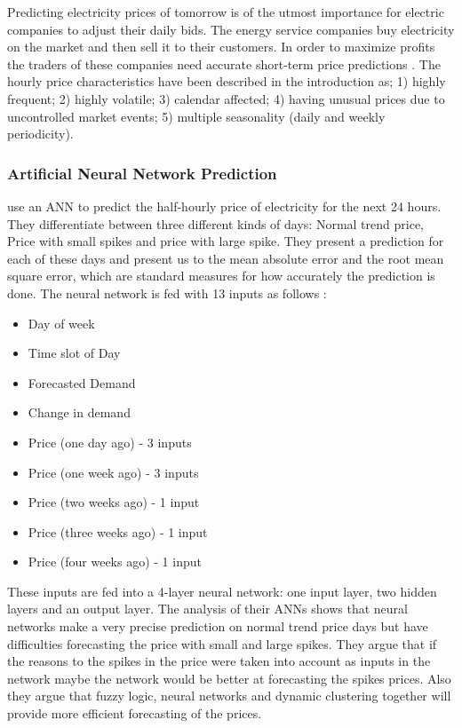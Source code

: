 Predicting electricity prices of tomorrow is of the utmost importance for electric companies to adjust their daily bids. The energy service companies buy electricity on the market and then sell it to their customers. In order to maximize profits the traders of these companies need accurate short-term price predictions \cite{EnergyPriceForecasting}. The hourly price characteristics have been described in the introduction as; 1) highly frequent; 2) highly volatile; 3) calendar affected; 4) having unusual prices due to uncontrolled market events; 5) multiple seasonality (daily and weekly periodicity).

\subsubsection{Artificial Neural Network Prediction}\label{sec:scatterPaper}
\cite{singhal2011electricity} use an ANN to predict the half-hourly price of electricity for the next 24 hours. They differentiate between three different kinds of days: Normal trend price, Price with small spikes and price with large spike. They present a prediction for each of these days and present us to the mean absolute error and the root mean square error, which are standard measures for how accurately the prediction is done. The neural network is fed with 13 inputs as follows \cite{singhal2011electricity}:
\begin{itemize}[noitemsep,topsep=3pt,parsep=2pt,partopsep=3pt]
\item Day of week
\item Time slot of Day
\item Forecasted Demand
\item Change in demand
\item Price (one day ago) - 3 inputs 
\item Price (one week ago) - 3 inputs
\item Price (two weeks ago) - 1 input 
\item Price (three weeks ago) - 1 input 
\item Price (four weeks ago) - 1 input
\end{itemize}
These inputs are fed into a 4-layer neural network: one input layer, two hidden layers and an output layer. The analysis of their ANNs shows that neural networks make a very precise prediction on normal trend price days but have difficulties forecasting the price with small and large spikes. They argue that if the reasons to the spikes in the price were taken into account as inputs in the network maybe the network would be better at forecasting the spikes prices. Also they argue that fuzzy logic, neural networks and dynamic clustering together will provide more efficient forecasting of the prices.
